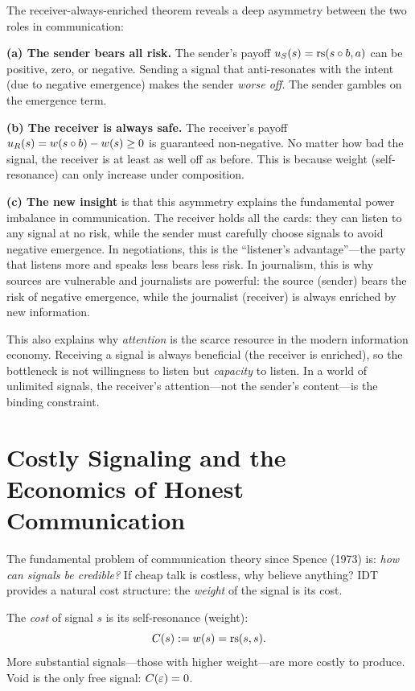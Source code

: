 \begin{interpretation}
The receiver-always-enriched theorem reveals a deep asymmetry between
the two roles in communication:

\textbf{(a) The sender bears all risk.} The sender's payoff
$u_S(s) = \mathrm{rs}(s \circ b, a)$ can be positive, zero, or negative.
Sending a signal that anti-resonates with the intent (due to negative
emergence) makes the sender \emph{worse off}. The sender gambles on
the emergence term.

\textbf{(b) The receiver is always safe.} The receiver's payoff
$u_R(s) = w(s \circ b) - w(s) \geq 0$ is guaranteed non-negative.
No matter how bad the signal, the receiver is at least as well off as
before. This is because weight (self-resonance) can only increase under
composition.

\textbf{(c) The new insight} is that this asymmetry explains the
fundamental power imbalance in communication. The receiver holds all the
cards: they can listen to any signal at no risk, while the sender must
carefully choose signals to avoid negative emergence. In negotiations,
this is the ``listener's advantage''---the party that listens more and
speaks less bears less risk. In journalism, this is why sources are
vulnerable and journalists are powerful: the source (sender) bears the
risk of negative emergence, while the journalist (receiver) is always
enriched by new information.

This also explains why \emph{attention} is the scarce resource in the
modern information economy. Receiving a signal is always beneficial
(the receiver is enriched), so the bottleneck is not willingness to
listen but \emph{capacity} to listen. In a world of unlimited signals,
the receiver's attention---not the sender's content---is the binding
constraint.
\end{interpretation}


\section{Costly Signaling and the Economics of Honest Communication}

The fundamental problem of communication theory since Spence (1973) is:
\emph{how can signals be credible?} If cheap talk is costless, why believe
anything? IDT provides a natural cost structure: the \emph{weight} of the
signal is its cost.

\begin{definition}
\label{def:signal-cost}
The \emph{cost} of signal $s$ is its self-resonance (weight):
\[
C(s) := w(s) = \mathrm{rs}(s, s).
\]
More substantial signals---those with higher weight---are more costly to
produce. Void is the only free signal: $C(\varepsilon) = 0$.
\end{definition}

